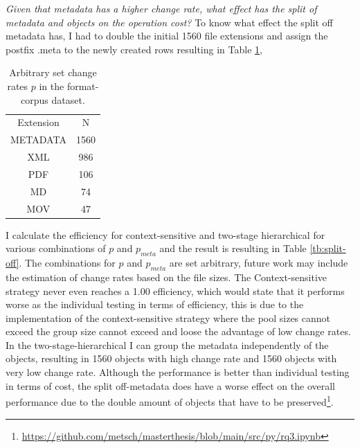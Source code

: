 \textit{Given that metadata has a higher change rate, what effect has the split of metadata and objects on the operation cost?}
To know what effect the split off metadata has, I had to double the initial 1560 file extensions and assign the postfix .meta to the newly created rows resulting in Table \ref{tb:metadata},
\begin{table}[t]
    \centering
    \begin{tabular}{c c}
        Extension & N \\
        METADATA & 1560 \\
        XML& 986 \\
        PDF& 106  \\
        MD& 74  \\
        MOV& 47  
    \end{tabular}
    \caption{Arbitrary set change rates $p$ in the format-corpus dataset.}
    \label{tb:metadata}
\end{table}
I calculate the efficiency for context-sensitive and two-stage hierarchical for various combinations of $p$ and $p_{meta}$ and the result is resulting in Table \ref{tb:split-off}. The combinations for $p$ and $p_{meta}$ are set arbitrary, future work may include the estimation of change rates based on the file sizes.
The Context-sensitive strategy never even reaches a 1.00 efficiency, which would state that it performs worse as the individual testing in terms of efficiency, this is due to the implementation of the context-sensitive strategy where the pool sizes cannot exceed the group size cannot exceed and loose the advantage of low change rates. In the two-stage-hierarchical I can group the metadata independently of the objects, resulting in 1560 objects with high change rate and 1560 objects with very low change rate. Although the performance is better than individual testing in terms of cost, the split off-metadata does have a worse effect on the overall performance due to the double amount of objects that have to be preserved\footnote{\url{https://github.com/metsch/masterthesis/blob/main/src/py/rq3.ipynb}}.
